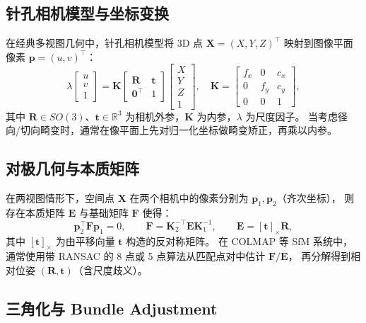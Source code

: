 \documentclass[12pt]{ctexart}
\begin{document}
\subsection{针孔相机模型与坐标变换}

在经典多视图几何中，针孔相机模型将 3D 点 $\bm{X} = (X,Y,Z)^\top$ 映射到图像平面像素 $\bm{p} = (u,v)^\top$：
\begin{equation}
  \lambda
  \begin{bmatrix}
    u \\ v \\ 1
  \end{bmatrix}
  =
  \bm{K}
  \begin{bmatrix}
    \bm{R} & \bm{t} \\
    \bm{0}^\top & 1
  \end{bmatrix}
  \begin{bmatrix}
    X \\ Y \\ Z \\ 1
  \end{bmatrix},
  \quad
  \bm{K} =
  \begin{bmatrix}
    f_x & 0   & c_x \\
    0   & f_y & c_y \\
    0   & 0   & 1
  \end{bmatrix},
\end{equation}
其中 $\bm{R}\in SO(3)$、$\bm{t}\in\mathbb{R}^3$ 为相机外参，$\bm{K}$ 为内参，$\lambda$ 为尺度因子。
当考虑径向/切向畸变时，通常在像平面上先对归一化坐标做畸变矫正，再乘以内参。

\subsection{对极几何与本质矩阵}

在两视图情形下，空间点 $\bm{X}$ 在两个相机中的像素分别为 $\bm{p}_1,\bm{p}_2$（齐次坐标），
则存在本质矩阵 $\bm{E}$ 与基础矩阵 $\bm{F}$ 使得：
\begin{equation}
  \bm{p}_2^\top \bm{F} \bm{p}_1 = 0,\qquad
  \bm{F} = \bm{K}_2^{-\top} \bm{E} \bm{K}_1^{-1},\qquad
  \bm{E} = [\bm{t}]_\times \bm{R},
\end{equation}
其中 $[\bm{t}]_\times$ 为由平移向量 $\bm{t}$ 构造的反对称矩阵。
在 COLMAP 等 SfM 系统中，通常使用带 RANSAC 的 8 点或 5 点算法从匹配点对中估计 $\bm{F}/\bm{E}$，
再分解得到相对位姿 $(\bm{R},\bm{t})$（含尺度歧义）。

\subsection{三角化与 Bundle Adjustment}
\end{document}
